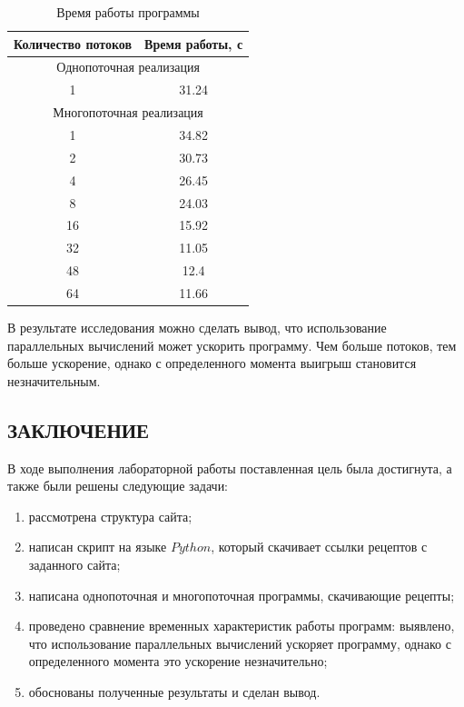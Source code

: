 \documentclass{article}
\begin{document}
\clearpage\begin{table}[h]
	\begin{center}
	\caption{\label{table} Время работы программы}
	\begin{tabular}{|c|c|}
		\hline
		Количество потоков & Время работы, с 
		\\ \hline
		\multicolumn{2}{|c|}{Однопоточная реализация} 
		\\ \hline
		1 & 31.24 
		\\ \hline
		\multicolumn{2}{|c|}{Многопоточная реализация} 
		\\ \hline
		1 & 34.82 
		\\ \hline
		2 & 30.73 
		\\ \hline
		4 & 26.45 
		\\ \hline
		8 & 24.03 
		\\ \hline
		16 & 15.92
		\\ \hline
		32 & 11.05
		\\ \hline
		48 & 12.4
		\\ \hline
		64 & 11.66
		\\ \hline
	\end{tabular}
	\end{center}
\end{table}

В результате исследования можно сделать вывод, что использование параллельных вычислений может ускорить программу.
Чем больше потоков, тем больше ускорение, однако с определенного момента выигрыш становится незначительным.

\clearpage\begin{center}\section*{ЗАКЛЮЧЕНИЕ}\end{center}
В ходе выполнения лабораторной работы поставленная цель была достигнута, а также были решены следующие задачи:
\begin{enumerate}
	\item рассмотрена структура сайта;
	\item написан скрипт на языке $Python$, который скачивает ссылки рецептов с заданного сайта;
	\item написана однопоточная и многопоточная программы, скачивающие рецепты;
	\item проведено сравнение временных характеристик работы программ: выявлено, что использование параллельных
вычислений ускоряет программу, однако с определенного момента это ускорение незначительно;
	\item обоснованы полученные результаты и сделан вывод.
\end{enumerate} 
\end{document}
